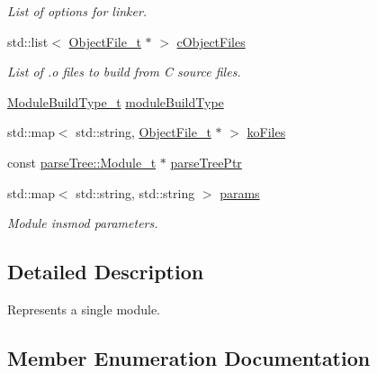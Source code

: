 \begin{DoxyCompactItemize}
\begin{DoxyCompactList}\small\item\em List of options for linker. \end{DoxyCompactList}\item 
std\+::list$<$ \hyperlink{structmodel_1_1_object_file__t}{Object\+File\+\_\+t} $\ast$ $>$ \hyperlink{structmodel_1_1_module__t_a234e09a3d01721b0890b12fcadd3e7b4}{c\+Object\+Files}
\begin{DoxyCompactList}\small\item\em List of .o files to build from C source files. \end{DoxyCompactList}\item 
\hyperlink{structmodel_1_1_module__t_a6c9277eb6ec850a82742e5be2ff28b46}{Module\+Build\+Type\+\_\+t} \hyperlink{structmodel_1_1_module__t_af9cddd8f1cfa93a05dfdd377396dc10d}{module\+Build\+Type}
\item 
std\+::map$<$ std\+::string, \hyperlink{structmodel_1_1_object_file__t}{Object\+File\+\_\+t} $\ast$ $>$ \hyperlink{structmodel_1_1_module__t_a9d79292110b6c30ef2c0a55e932f862c}{ko\+Files}
\item 
const \hyperlink{structparse_tree_1_1_module__t}{parse\+Tree\+::\+Module\+\_\+t} $\ast$ \hyperlink{structmodel_1_1_module__t_a578f87243f639d9f70f2babb53ff0c2e}{parse\+Tree\+Ptr}
\item 
std\+::map$<$ std\+::string, std\+::string $>$ \hyperlink{structmodel_1_1_module__t_a0a6380318c1b48336dc9348640deac71}{params}
\begin{DoxyCompactList}\small\item\em Module insmod parameters. \end{DoxyCompactList}\end{DoxyCompactItemize}


\subsection{Detailed Description}
Represents a single module. 

\subsection{Member Enumeration Documentation}

